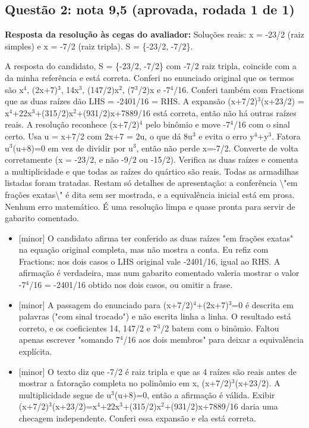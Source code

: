 \documentclass{article}%
\begin{document}
\subsection*{Questão 2: nota 9,5 (aprovada, rodada 1 de 1)}%
\textbf{Resposta da resolução às cegas do avaliador:} Soluções reais: x = -23/2 (raiz simples) e x = -7/2 (raiz tripla). S = \{-23/2, -7/2\}.\par %
A resposta do candidato, S = \{-23/2, -7/2\} com -7/2 raiz tripla, coincide com a da minha referência e está correta. Conferi no enunciado original que os termos são x$^{4}$, (2x+7)$^3$, 14x$^3$, (147/2)x$^2$, (7$^3$/2)x e -7$^{4}$/16. Conferi também com Fractions que as duas raízes dão LHS = -2401/16 = RHS. A expansão (x+7/2)$^3$(x+23/2) = x$^{4}$+22x$^3$+(315/2)x$^2$+(931/2)x+7889/16 está correta, então não há outras raízes reais. A resolução reconhece (x+7/2)$^{4}$ pelo binômio e move -7$^{4}$/16 com o sinal certo. Usa u = x+7/2 com 2x+7 = 2u, o que dá 8u$^3$ e evita o erro y$^{4}$+y$^3$. Fatora u$^3$(u+8)=0 em vez de dividir por u$^3$, então não perde x=-7/2. Converte de volta corretamente (x = -23/2, e não -9/2 ou -15/2). Verifica as duas raízes e comenta a multiplicidade e que todas as raízes do quártico são reais. Todas as armadilhas listadas foram tratadas. Restam só detalhes de apresentação: a conferência \textbackslash{}"em frações exatas\textbackslash{}" é dita sem ser mostrada, e a equivalência inicial está em prosa. Nenhum erro matemático. É uma resolução limpa e quase pronta para servir de gabarito comentado.%
\begin{itemize}%
\item%
{[}minor{]} O candidato afirma ter conferido as duas raízes "em frações exatas" na equação original completa, mas não mostra a conta. Eu refiz com Fractions: nos dois casos o LHS original vale -2401/16, igual ao RHS. A afirmação é verdadeira, mas num gabarito comentado valeria mostrar o valor -7$^{4}$/16 = -2401/16 obtido nos dois casos, ou omitir a frase.%
\item%
{[}minor{]} A passagem do enunciado para (x+7/2)$^{4}$+(2x+7)$^3$=0 é descrita em palavras ("com sinal trocado") e não escrita linha a linha. O resultado está correto, e os coeficientes 14, 147/2 e 7$^3$/2 batem com o binômio. Faltou apenas escrever "somando 7$^{4}$/16 aos dois membros" para deixar a equivalência explícita.%
\item%
{[}minor{]} O texto diz que -7/2 é raiz tripla e que as 4 raízes são reais antes de mostrar a fatoração completa no polinômio em x, (x+7/2)$^3$(x+23/2). A multiplicidade segue de u$^3$(u+8)=0, então a afirmação é válida. Exibir (x+7/2)$^3$(x+23/2)=x$^{4}$+22x$^3$+(315/2)x$^2$+(931/2)x+7889/16 daria uma checagem independente. Conferi essa expansão e ela está correta.%
\end{itemize}%
\end{document}
